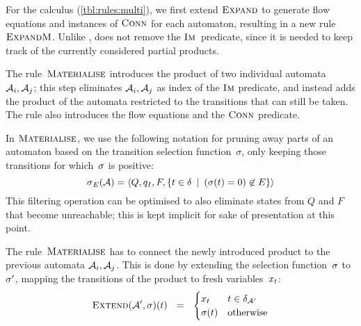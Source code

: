     For the calculus (\cref{tbl:rules:multi}), we first extend
    $\textsc{Expand}$ to generate flow equations and instances of $\operatorname{\textsc{Conn}}$
    for each automaton, resulting in a new rule $\textsc{ExpandM}$.  Unlike
    \Expand{}, \ExpandM{} does not remove the $\operatorname{\textsc{Im}}$~predicate,
    since it is needed to keep track of the currently considered
    partial products.


The rule~$\textsc{Materialise}$ introduces the product of two individual
automata~$\mathcal{A}_i, \mathcal{A}_j$; this step eliminates
$\mathcal{A}_i, \mathcal{A}_j$ as index of the $\operatorname{\textsc{Im}}$ predicate, and
instead adds the product of the automata restricted to the
transitions that can still be taken. The rule
also introduces the flow equations and the $\operatorname{\textsc{Conn}}$ predicate.

In $\textsc{Materialise}$, we use the following notation for pruning away
parts of an automaton based on the transition selection
function~$\sigma$, only keeping those transitions for which~$\operatorname{\sigma}$
is positive:
\begin{equation*}
  \operatorname{\sigma}_{E}(\mathcal{A}) =
  \left\langle Q, q_I, F,
\left\{t \in \delta \:\mid\: (\operatorname{\sigma}(t) = 0) \not\in E\right\}\right\rangle
\end{equation*}
This filtering operation can be optimised to also eliminate states from
$Q$ and $F$ that become unreachable; this is kept implicit for sake of
presentation at this point.

The rule~$\textsc{Materialise}$ has to connect the newly introduced
product to the previous automata
$\mathcal{A}_i, \mathcal{A}_j$. This is done by extending the
selection function~$\operatorname{\sigma}$ to $\operatorname{\sigma}'$, mapping the transitions of the product
to fresh variables~$x_{t}$:
\begin{equation*}
  \textsc{Extend}(\mathcal{A}',\sigma)(t)
  ~~=~~
  \begin{cases}
    x_{t} & t \in \delta_{\mathcal{A}'}
    \\
    \operatorname{\sigma}(t) & \text{otherwise}
  \end{cases}
\end{equation*}

